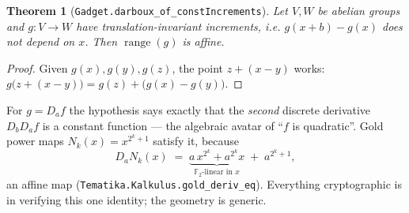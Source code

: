 \documentclass[11pt]{article}
\newcommand{\FF}{\mathbb{F}}
\newcommand{\lean}[1]{\texttt{\small #1}}
\theoremstyle{definition}
\theoremstyle{plain}
\newtheorem{thmA}{Theorem}
\begin{document}
\begin{thmA}[\lean{Gadget.darboux\_of\_constIncrements}]
Let $V,W$ be abelian groups and $g: V \to W$ have translation-invariant increments, i.e.
$g(x+b) - g(x)$ does not depend on $x$.  Then $\operatorname{range}(g)$ is affine.
\end{thmA}

\begin{proof}
Given $g(x), g(y), g(z)$, the point $z + (x-y)$ works:
$g\bigl(z+(x-y)\bigr) = g(z) + \bigl(g(x)-g(y)\bigr)$.
\end{proof}

For $g = D_a f$ the hypothesis says exactly that the \emph{second} discrete derivative
$D_b D_a f$ is a constant function --- the algebraic avatar of ``$f$ is quadratic''.  Gold
power maps $N_k(x) = x^{2^k+1}$ satisfy it, because
\[
  D_a N_k(x) \;=\; \underbrace{a\,x^{2^k} + a^{2^k}x}_{\text{$\FF_2$-linear in } x} \;+\; a^{2^k+1},
\]
an affine map (\lean{Tematika.Kalkulus.gold\_deriv\_eq}).  Everything cryptographic is in
verifying this one identity; the geometry is generic.
\end{document}
